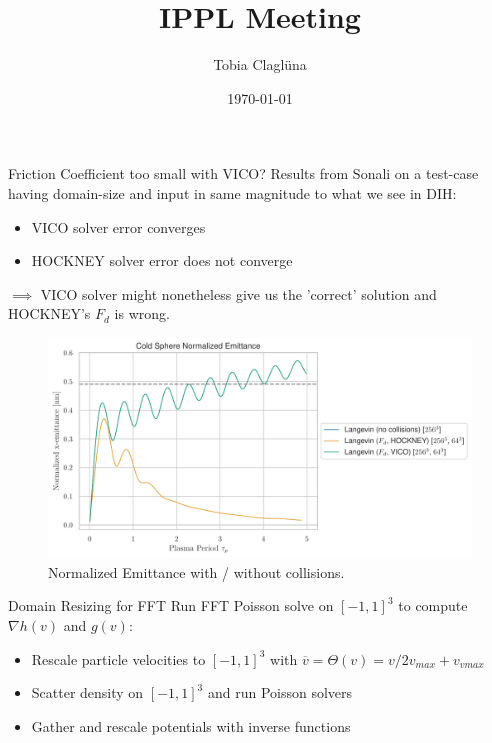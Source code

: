 

\title[\today]{IPPL Meeting}

\author{Tobia Claglüna}
\date{\today}
\def \myEmail {tobia.clagluena@psi.ch}





\begin{frame}[c]{Friction Coefficient too small with VICO?}
    Results from Sonali on a test-case having domain-size and input in same magnitude to what we see in DIH:
        \begin{itemize}
            \item VICO solver error converges
            \item HOCKNEY solver error does not converge
        \end{itemize}
    $\implies$ VICO solver might nonetheless give us the 'correct' solution and HOCKNEY's $F_d$ is wrong.
    \begin{figure}[!htb]
        \centering
        \captionsetup{justification=centering}
      \includegraphics[width=0.8\linewidth]{figures/emittance.pdf}
      \caption{Normalized Emittance with / without collisions.}
      \label{fig:emittance}
    \end{figure}
\end{frame}

\begin{frame}[c]{Domain Resizing for FFT}
    Run FFT Poisson solve on $[-1,1]^3$ to compute $\nabla h(v)$ and $g(v)$:
    \begin{itemize}
        \item Rescale particle velocities to $[-1,1]^3$ with $\overline v = \Theta(v) = v/2v_{max} + v_{vmax}$
        \item Scatter density on $[-1,1]^3$ and run Poisson solvers
        \item Gather and rescale potentials with inverse functions
    \end{itemize}
\end{frame}

